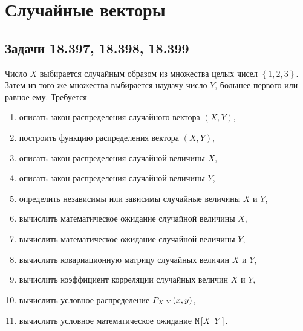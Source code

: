 \chapter{Случайные векторы}

\section*{Задачи 18.397, 18.398, 18.399}

Число $X$ выбирается случайным образом из множества целых чисел $\left \{ 1, 2, 3 \right \}$. Затем из того же множества выбирается наудачу число $Y$, большее первого
или равное ему. Требуется
\begin{enumerate}
    \item описать закон распределения случайного вектора $\left ( X, Y \right )$,
    \item построить функцию распределения вектора $(X, Y)$,
    \item описать закон распределения случайной величины $X$,
    \item описать закон распределения случайной величины $Y$,
    \item определить независимы или зависимы случайные величины $X$ и $Y$,
    \item вычислить математическое ожидание случайной величины $X$,
    \item вычислить математическое ожидание случайной величины $Y$,
    \item вычислить ковариационную матрицу случайных величин $X$ и $Y$,
    \item вычислить коэффициент корреляции случайных величин $X$ и $Y$,
    \item вычислить условное распределение $P_{X \left | Y \right .}(x,y)$,
    \item вычислить условное математическое ожидание $\mathtt{M} \left [ X \left | Y \right . \right ]$.
\end{enumerate}

